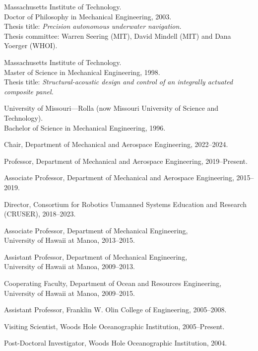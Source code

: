 
\begin{cvitems}
  \item Massachusetts Institute of Technology.\\
        Doctor of Philosophy in Mechanical Engineering, 2003.\\
        Thesis title: \emph{Precision autonomous underwater navigation.}\\
        Thesis committee: Warren Seering (MIT), David Mindell (MIT) and Dana Yoerger (WHOI).
  \item Massachusetts Institute of Technology.\\
        Master of Science in Mechanical Engineering, 1998.\\
        Thesis title: \emph{Structural-acoustic design and control of an integrally actuated composite panel.}
  \item University of Missouri---Rolla (now Missouri University of Science and Technology).\\
        Bachelor of Science in Mechanical Engineering, 1996.
\end{cvitems}

\begin{cvitems}
  \item Chair, Department of Mechanical and Aerospace Engineering, 2022--2024.
  \item Professor, Department of Mechanical and Aerospace Engineering, 2019--Present.
  \item Associate Professor, Department of Mechanical and Aerospace Engineering, 2015--2019.
  \item Director, Consortium for Robotics Unmanned Systems Education and Research (CRUSER), 2018--2023.
\end{cvitems}

\begin{cvitems}
  \item Associate Professor, Department of Mechanical Engineering, \\University of Hawaii at Manoa, 2013--2015.
  \item Assistant Professor, Department of Mechanical Engineering, \\University of Hawaii at Manoa, 2009--2013.
  \item Cooperating Faculty, Department of Ocean and Resources Engineering, \\University of Hawaii at Manoa, 2009--2015.
  \item Assistant Professor, Franklin W. Olin College of Engineering, 2005--2008.
  \item Visiting Scientist, Woods Hole Oceanographic Institution, 2005--Present.
  \item Post-Doctoral Investigator, Woods Hole Oceanographic Institution, 2004.
\end{cvitems}

